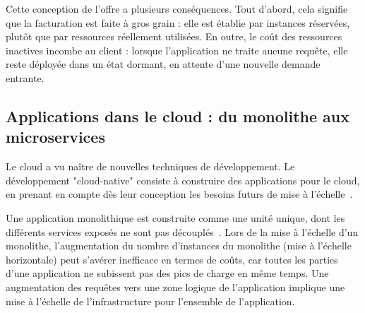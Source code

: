 Cette conception de l'offre a plusieurs conséquences. Tout d'abord, cela signifie que la facturation est faite à gros grain : elle est établie par instances réservées, plutôt que par ressources réellement utilisées. En outre, le coût des ressources inactives incombe au client : lorsque l'application ne traite aucune requête, elle reste déployée dans un état dormant, en attente d'une nouvelle demande entrante.

\subsection{Applications dans le cloud : du monolithe aux microservices}

Le cloud a vu naître de nouvelles techniques de développement. Le développement "cloud-native" consiste à construire des applications pour le cloud, en prenant en compte dès leur conception les besoins futurs de mise à l'échelle~\cite{dragoniMicroservicesHowMake2018, martinfowler2014microservices}.


Une application monolithique est construite comme une unité unique, dont les différents services exposés ne sont pas découplés~\cite{villamizarEvaluatingMonolithicMicroservice2015}. Lors de la mise à l'échelle d'un monolithe, l'augmentation du nombre d'instances du monolithe (mise à l'échelle horizontale) peut s'avérer inefficace en termes de coûts, car toutes les parties d'une application ne subissent pas des pics de charge en même temps. Une augmentation des requêtes vers une zone logique de l'application implique une mise à l'échelle de l'infrastructure pour l'ensemble de l'application.


